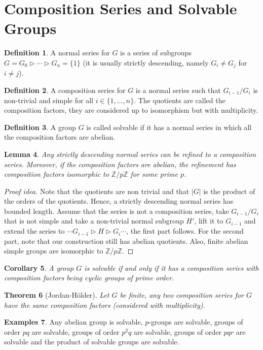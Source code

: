 \documentclass[paper=a4, fontsize=12pt]{scrartcl} %
\newtheorem{thm}{Theorem}[section]
\newtheorem{cor}[thm]{Corollary}
\newtheorem{lem}[thm]{Lemma}
\theoremstyle{definition}
\newtheorem{defn}[thm]{Definition}
\newtheorem{exmps}[thm]{Examples}
\theoremstyle{remark}
\newcommand{\Z}{\mathbb{Z}}
\numberwithin{equation}{section} %
\numberwithin{figure}{section} %
\numberwithin{table}{section} %
\begin{document}
\section{Composition Series and Solvable Groups}
\begin{defn}
	A normal series for $G$ is a series of subgroups $G = G_0 \rhd \cdots \rhd G_n = \{1\}$ (it is usually strictly descending, namely $G_i \neq G_j$ for $i \neq j$).
\end{defn}
\begin{defn}
	A composition series for $G$ is a normal series such that $G_{i-1}/G_i$ is non-trivial and simple for all $i \in \{1,\dots, n\}$. The quotients are called the composition factors, they are considered up to isomorphism but with multiplicity.
\end{defn}
\begin{defn}
	A group $G$ is called solvable if it has a normal series in which all the composition factors are abelian.
\end{defn}
\begin{lem}
	Any strictly descending normal series can be refined to a composition series. Moreover, if the composition factors are abelian, the refinement has composition factors isomorphic to $\Z/p\Z$ for some prime $p$.
\end{lem}
\begin{proof}[Proof idea]
	Note that the quotients are non trivial and that $|G|$ is the product of the orders of the quotients. Hence, a strictly descending normal series has bounded length. Assume that the series is not a composition series, take $G_{i-1}/G_i$ that is not simple and take a non-trivial normal subgroup $H'$, lift it to $G_{i-1}$ and extend the series to $\cdots G_{i-1} \rhd H \rhd G_i \cdots$, the first part follows. For the second part, note that our construction still has abelian quotients. Also, finite abelian simple groups are isomorphic to $\Z/p\Z$. 
\end{proof}
\begin{cor}
	A group $G$ is solvable if and only if it has a composition series with composition factors being cyclic groups of prime order.
\end{cor}
\begin{thm}[Jordan-H\"older]
	Let $G$ be finite, any two composition series for $G$ have the same composition factors (considered with multiplicity).
\end{thm}
\begin{exmps}
	Any abelian group is solvable, $p$-groups are solvable, groups of order $pq$ are solvable, groups of order $p^2q$ are solvable, groups of order $pqr$ are solvable and the product of solvable groups are solvable.
\end{exmps}
\end{document}
